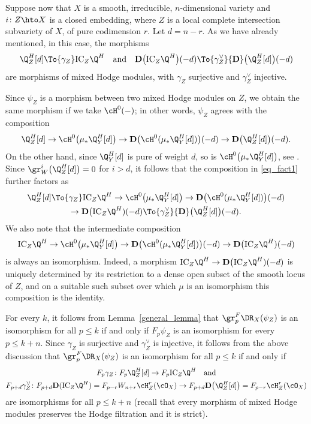 \begin{rmk}\label{rmk_two_morphisms}
Suppose now that $X$ is a smooth, irreducible, $n$-dimensional variety and $i\colon Z\hto X$ is a closed embedding,
where $Z$ is a local complete intersection subvariety of $X$, of pure codimension $r$. Let $d=n-r$.
As we have already mentioned, in this case, the morphisms
\[\Q^H_Z[d]\To{\gamma_Z}\mathrm{IC}_Z\Q^H\quad\text{and}\quad {\mathbf D}\big(\mathrm{IC}_Z\Q^H\big)(-d)
\To{\gamma_Z^{\vee}}{\mathbf D}\big(\Q^H_Z[d]\big)(-d)\]
are morphisms of mixed Hodge modules, with $\gamma_Z$ surjective and $\gamma_Z^{\vee}$ injective.

Since $\psi_Z$ is a morphism between two mixed Hodge modules on $Z$, we obtain the same morphism
if we take $\cH^0(-)$; in other words, $\psi_Z$ agrees with the composition
\begin{equation}\label{eq_fact1}
\Q_Z^H[d]\to \cH^0\big(\mu_*\Q_Y^H[d]\big)\to {\mathbf D}\big(\cH^0(\mu_*\Q_Y^H[d])\big)(-d)\to {\mathbf D}\big(\Q_Z^H[d]\big)(-d).
\end{equation}
On the other hand, since $\Q^H_Y[d]$ is pure of weight $d$, so is $\cH^0\big(\mu_*\Q_Y^H[d]\big)$, see \cite[(4.5.2)]{Saito_MHM}.
Since $\gr_W^i\big(\Q_Z^H[d]\big)=0$ for $i>d$, it follows that
the composition in \eqref{eq_fact1} further factors as
\begin{multline}\label{eq_fact2}
\Q_Z^H[d]\To{\gamma_Z} \mathrm{IC}_Z\Q^H\to \cH^0\big(\mu_*\Q_Y^H[d]\big)\to {\mathbf D}\big(\cH^0(\mu_*\Q_Y^H[d])\big)(-d)
\\
\to
{\mathbf D}\big(\mathrm{IC}_Z\Q^H)(-d)\To{\gamma_Z^{\vee}} {\mathbf D}\big(\Q_Z^H[d]\big)(-d).
\end{multline}
We also note that the intermediate composition
\[\mathrm{IC}_Z\Q^H\to \cH^0\big(\mu_*\Q_Y^H[d]\big)\to {\mathbf D}\big(\cH^0(\mu_*\Q_Y^H[d])\big)(-d)\to
{\mathbf D}\big(\mathrm{IC}_Z\Q^H)(-d)\]
is always an isomorphism. Indeed, a morphism $\mathrm{IC}_Z\Q^H\to {\mathbf D}\big(\mathrm{IC}_Z\Q^H)(-d)$ is uniquely determined
by its restriction to a dense open subset of the smooth locus of $Z$, and on a suitable such subset over which $\mu$ is an isomorphism
this composition is the identity.

For every $k$, it follows from Lemma~\ref{general_lemma} that $\gr_p^F\DR_X(\psi_Z)$ is an isomorphism for all $p\leq k$
if and only if $F_p\psi_Z$ is an isomorphism for every $p\leq k+n$. Since $\gamma_Z$ is surjective and $\gamma_Z^{\vee}$ is injective,
it follows from the above discussion that $\gr_p^F\DR_X(\psi_Z)$ is an isomorphism for all $p\leq k$ if and only if
\begin{gather*}
F_p\gamma_Z\colon F_p\Q_Z^H[d]\to F_p\mathrm{IC}_Z\Q^H\quad \text{and}\\
F_{p+d}\gamma_Z^{\vee} \colon F_{p+d}{\mathbf D}(\mathrm{IC}_Z\Q^H)=F_{p-r}W_{n+r}\cH^r_Z(\cO_X)\to
F_{p+d}{\mathbf D}\big(\Q_Z^H[d]\big)=F_{p-r}\cH_Z^r(\cO_X)
\end{gather*}
are isomorphisms for all $p\leq k+n$ (recall that every morphism of mixed Hodge modules preserves the Hodge filtration and it is strict).
\end{rmk}

